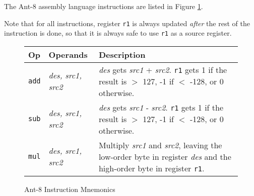 The {\sc Ant-8} assembly language instructions are listed in Figure
\ref{mnemonic-table}.

Note that for all instructions, register {\tt r1} is always
updated {\em after} the rest of the instruction is done,
so that it is always safe to use {\tt r1} as a source register.

\begin{figure}[htp]
\caption{ \label{mnemonic-table} {\sc Ant-8} Instruction Mnemonics }
\vspace{3mm}
\noindent
\begin{tabular}{|ll|p{4.5in}|}
\hline
        {\bf Op}        & {\bf Operands}        & {\bf Description}     \\
\hline
\hline
        {\tt add}       & {\em des, src1, src2} &
                {\em des} gets {\em src1} + {\em src2}.
                {\tt r1} gets 1 if the result is $>$ 127,
		-1 if $<$ -128, or 0 otherwise. \\
\hline
        {\tt sub}       & {\em des, src1, src2} &
                {\em des} gets {\em src1} - {\em src2}.
                {\tt r1} gets 1 if the result is $>$ 127,
		-1 if $<$ -128, or 0 otherwise. \\
\hline
        {\tt mul}       & {\em des, src1, src2} &
                Multiply {\em src1} and {\em src2},
                leaving the low-order byte in register {\em des}
                and the high-order byte in register {\tt r1}. \\


\end{tabular}
\end{figure}
